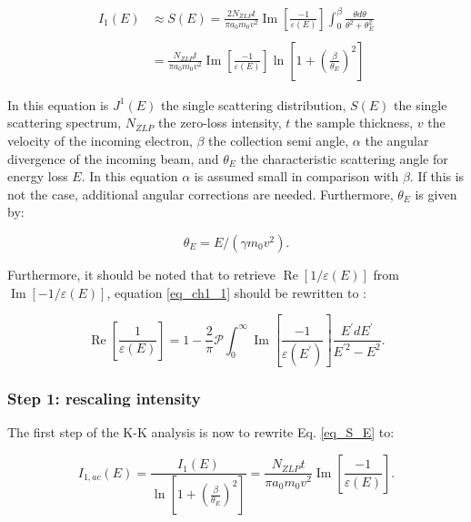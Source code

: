 \begin{equation}\label{eq_S_E}
\begin{aligned}
I_{1}(E) & \approx S(E)=\frac{2 N_{ZLP} t}{\pi a_{0} m_{0} v^{2}} \operatorname{Im}\left[\frac{-1}{\varepsilon(E)}\right] \int_{0}^{\beta} \frac{\theta d \theta}{\theta^{2}+\theta_{E}^{2}} \\
\\
&=\frac{N_{ZLP} t}{\pi a_{0} m_{0} v^{2}} \operatorname{Im}\left[\frac{-1}{\varepsilon(E)}\right] \ln \left[1+\left(\frac{\beta}{\theta_{E}}\right)^{2}\right]
\end{aligned}
\end{equation}

In this equation is $J^1(E)$ the single scattering distribution, $S(E)$ the single scattering spectrum, $N_{ZLP}$ the zero-loss intensity, $t$ the sample thickness, $v$ the velocity of the incoming electron, $\beta$ the collection semi angle, $\alpha$ the angular divergence of the incoming beam, and $\theta_E$ the characteristic scattering angle for energy loss $E$. In this equation $\alpha$ is assumed small in comparison with $\beta$. If this is not the case, additional angular corrections are needed. Furthermore, $\theta_E$ is given by:

\begin{equation} \label{eq_th_E}
    \theta_E = E/(\gamma m_0v^2) .
\end{equation}


Furthermore, it should be noted that to retrieve $\operatorname{Re}\left[1/\varepsilon(E)\right]$ from $\operatorname{Im}\left[-1/\varepsilon(E)\right]$, equation \eqref{eq_ch1_1} should be rewritten to \cite{Dapor2017}:

\begin{equation}\label{eq_kkr_eps}
    \operatorname{Re}\left[\frac{1}{\varepsilon(E)}\right]=1-\frac{2}{\pi} \mathcal{P} \int_{0}^{\infty} \operatorname{Im}\left[\frac{-1}{\varepsilon\left(E^{\prime}\right)}\right] \frac{E^{\prime} d E^{\prime}}{E^{\prime 2}-E^{2}}.
\end{equation}




\subsubsection{Step 1: rescaling intensity}
The first step of the K-K analysis is now to rewrite Eq. \eqref{eq_S_E} to:

\begin{equation}\label{eq_J_ac}
    I_{1,ac}(E) = \frac{I_1(E)}{\ln \left[1+\left(\frac{\beta}{\theta_{E}}\right)^{2}\right]} =\frac{N_{ZLP} t}{\pi a_{0} m_{0} v^{2}}  \operatorname{Im}\left[\frac{-1}{\varepsilon(E)}\right] .
\end{equation}


